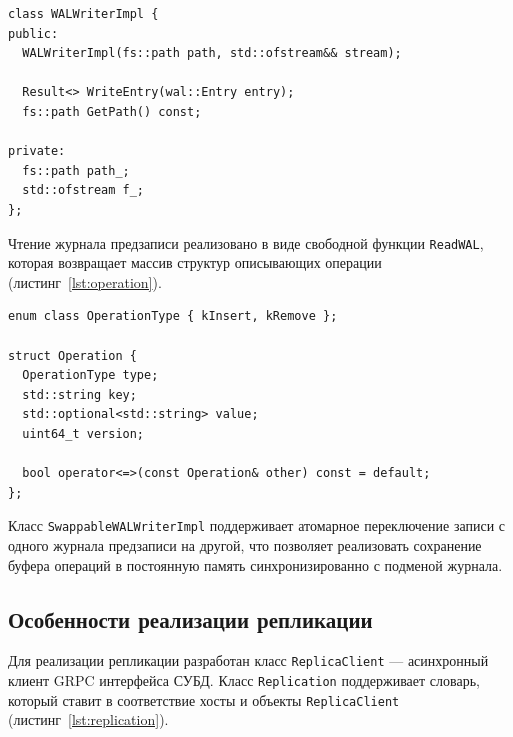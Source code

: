 \documentclass[14pt, russian]{scrartcl}
\newcommand{\refAlgo}[1]{(листинг~\ref{#1})}
\begin{document}
\begin{listing}[H]
  \caption{Объявление класса WALWriterIMPl.}
  \label{lst:wal_writer}
  \begin{verbatim}
class WALWriterImpl {
public:
  WALWriterImpl(fs::path path, std::ofstream&& stream);

  Result<> WriteEntry(wal::Entry entry);
  fs::path GetPath() const;

private:
  fs::path path_;
  std::ofstream f_;
};
  \end{verbatim}
\end{listing}

Чтение журнала предзаписи реализовано в виде свободной функции \verb|ReadWAL|,
которая возвращает массив структур описывающих операции \refAlgo{lst:operation}.

\begin{listing}[H]
  \caption{Объявление структуры Operation.}
  \label{lst:operation}
  \begin{verbatim}
enum class OperationType { kInsert, kRemove };

struct Operation {
  OperationType type;
  std::string key;
  std::optional<std::string> value;
  uint64_t version;

  bool operator<=>(const Operation& other) const = default;
};
  \end{verbatim}
\end{listing}

Класс \verb|SwappableWALWriterImpl| поддерживает атомарное переключение записи с
одного журнала предзаписи на другой, что позволяет реализовать сохранение буфера
операций в постоянную память синхронизированно с подменой
журнала. %


\subsection{Особенности реализации репликации}

Для реализации репликации разработан класс \verb|ReplicaClient| --- асинхронный
клиент GRPC интерфейса СУБД. Класс \verb|Replication| поддерживает словарь,
который ставит в соответствие хосты и объекты \verb|ReplicaClient|
\refAlgo{lst:replication}.
\end{document}
